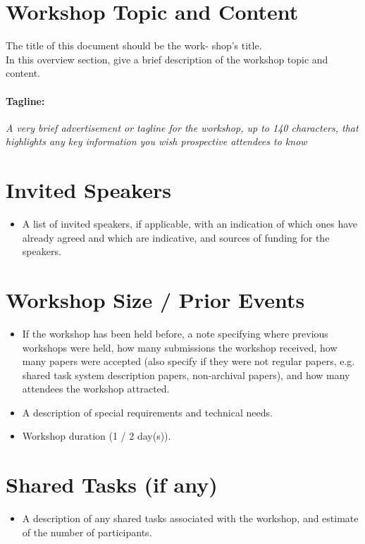 \section{Workshop Topic and Content}
The title of this document should be the work- shop’s title.\\
In this overview section, give a brief description of the workshop topic and content.

\paragraph{Tagline:} \textit{A very brief advertisement or tagline for the workshop, up to 140 characters, that highlights any key information you wish prospective attendees to know}

\section{Invited Speakers}
\begin{itemize}
  \item A list of invited speakers, if applicable, with an indication of which ones have already agreed and which are indicative, and sources of funding for the speakers.
\end{itemize}

\section{Workshop Size / Prior Events}
\begin{itemize}
  \item If the workshop has been held before, a note specifying where previous workshops were held, how many submissions the workshop received, how many papers were accepted (also specify if they were not regular papers, e.g. shared task system description papers, non-archival papers), and how many attendees the workshop attracted.
  \item A description of special requirements and technical needs.
  \item Workshop duration (1 / 2 day(s)).
\end{itemize}

\section{Shared Tasks (if any)}
\begin{itemize}
  \item A description of any shared tasks associated with the workshop, and estimate of the number of participants.
\end{itemize}

